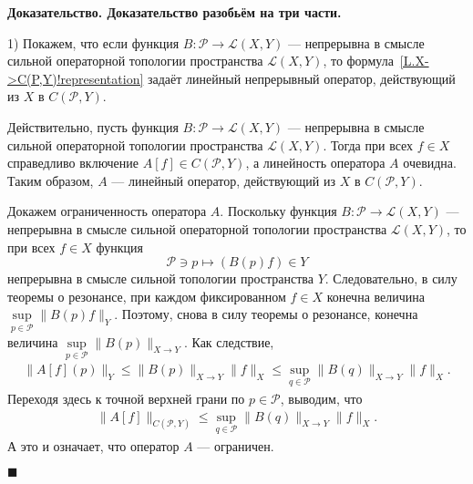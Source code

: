 \documentclass{report}
\newenvironment{Proof}{\par\noindent\bf Доказательство.\rm}{ $\blacksquare$\par}
\begin{document}
\begin{Proof}
Доказательство разобьём на три части.

1) Покажем, что если функция $B:\mathcal{P}\to\mathcal{L}(X,Y)$ --- непрерывна в смысле сильной операторной топологии пространства $\mathcal{L}(X,Y)$, то формула~\eqref{L.X->C(P,Y)!representation} задаёт линейный непрерывный оператор, действующий из $X$ в $C(\mathcal{P},Y)$.

Действительно, пусть функция $B:\mathcal{P}\to\mathcal{L}(X,Y)$ --- непрерывна в смысле сильной операторной топологии пространства $\mathcal{L}(X,Y)$. Тогда при всех $f\in X$ справедливо включение $A[f]\in C(\mathcal{P},Y)$, а линейность оператора $A$ очевидна. Таким образом, $A$ --- линейный оператор, действующий из $X$ в $C(\mathcal{P},Y)$.

Докажем ограниченность оператора $A$. Поскольку функция $B:\mathcal{P}\to\mathcal{L}(X,Y)$ --- непрерывна в смысле сильной операторной топологии пространства $\mathcal{L}(X,Y)$, то при всех $f\in X$ функция
$$
\mathcal{P}\ni p\mapsto (B(p)f) \in Y
$$
непрерывна в смысле сильной топологии пространства $Y$. Следовательно, в силу теоремы о резонансе, при каждом фиксированном $f\in X$ конечна величина
$\sup\limits_{p\in\mathcal{P}}\|B(p)f\|_Y$. Поэтому, снова в силу теоремы о резонансе, конечна величина $\sup\limits_{p\in\mathcal{P}}\|B(p)\|_{X\to Y}$. Как следствие,
\begin{gather*}
\|A[f](p)\|_Y\leqslant\|B(p)\|_{X\to Y}\|f\|_X\leqslant\sup\limits_{q\in\mathcal{P}}\|B(q)\|_{X\to Y}\|f\|_{X}.
\end{gather*}
Переходя здесь к точной верхней грани по $p\in\mathcal{P}$, выводим, что
\begin{gather*}
\|A[f]\|_{C(\mathcal{P},Y)}\leqslant\sup\limits_{q\in\mathcal{P}}\|B(q)\|_{X\to Y}\|f\|_{X}.
\end{gather*}
А это и означает, что оператор $A$ --- ограничен.


\end{Proof}
\end{document}
